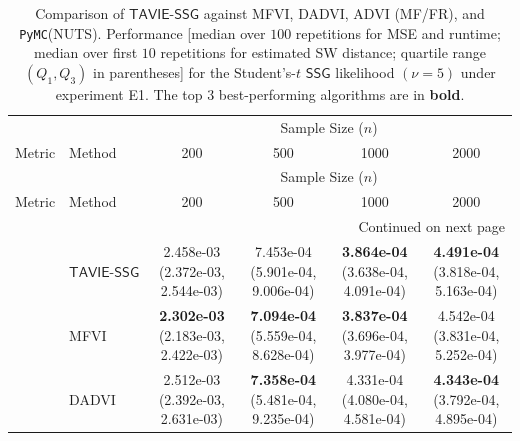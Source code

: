 \documentclass[12pt]{article}
\numberwithin{equation}{section}
\newcommand{\ssg}{\mathsf{SSG}}
\newcommand{\tssg}{\mathsf{TAVIE}\text{-}\mathsf{SSG}}
\begin{document}
{\scriptsize
\setlength{\tabcolsep}{3pt}
\renewcommand{\arraystretch}{1.15}%
\begin{longtable}{llcccc}
\caption{\footnotesize{Comparison of $\tssg$ against MFVI, DADVI, ADVI (MF/FR), and \texttt{PyMC}(NUTS). Performance [median over $100$ repetitions for MSE and runtime; median over first $10$ repetitions for estimated SW distance; quartile range $(Q_1, Q_3)$ in parentheses] for the Student's-$t$ $\ssg$ likelihood $(\nu=5)$ under experiment E1. The top $3$ best-performing algorithms are in \textbf{bold}.}}
\label{tab:student_singlep_multin}\\
\toprule
\toprule
 &  & \multicolumn{4}{c}{Sample Size ($n$)} \\
\cmidrule(lr){3-6}
Metric & Method & 200 & 500 & 1000 & 2000 \\
\midrule
\endfirsthead

\toprule
 &  & \multicolumn{4}{c}{Sample Size ($n$)} \\
\cmidrule(lr){3-6}
Metric & Method & 200 & 500 & 1000 & 2000 \\
\midrule
\endhead

\midrule
\multicolumn{6}{r}{Continued on next page} \\
\midrule
\endfoot

\bottomrule
\endlastfoot

\multirow{6}{*}{MSE of $\widehat{\beta}$}
& $\tssg$
& \makecell[c]{2.458e-03\\(2.372e-03, 2.544e-03)}
& \makecell[c]{7.453e-04\\(5.901e-04, 9.006e-04)}
& \makecell[c]{\textbf{3.864e-04}\\(3.638e-04, 4.091e-04)}
& \makecell[c]{\textbf{4.491e-04}\\(3.818e-04, 5.163e-04)} \\

& MFVI
& \makecell[c]{\textbf{2.302e-03}\\(2.183e-03, 2.422e-03)}
& \makecell[c]{\textbf{7.094e-04}\\(5.559e-04, 8.628e-04)}
& \makecell[c]{\textbf{3.837e-04}\\(3.696e-04, 3.977e-04)}
& \makecell[c]{4.542e-04\\(3.831e-04, 5.252e-04)} \\

& DADVI
& \makecell[c]{2.512e-03\\(2.392e-03, 2.631e-03)}
& \makecell[c]{\textbf{7.358e-04}\\(5.481e-04, 9.235e-04)}
& \makecell[c]{4.331e-04\\(4.080e-04, 4.581e-04)}
& \makecell[c]{\textbf{4.343e-04}\\(3.792e-04, 4.895e-04)} \\


\end{longtable}}
\end{document}
